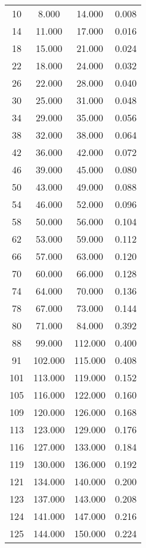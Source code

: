 % 
\begin{tabular}{cccc}
  \hline
  \hline
10 & 8.000 & 14.000 & 0.008 \\ 
  14 & 11.000 & 17.000 & 0.016 \\ 
  18 & 15.000 & 21.000 & 0.024 \\ 
  22 & 18.000 & 24.000 & 0.032 \\ 
  26 & 22.000 & 28.000 & 0.040 \\ 
  30 & 25.000 & 31.000 & 0.048 \\ 
  34 & 29.000 & 35.000 & 0.056 \\ 
  38 & 32.000 & 38.000 & 0.064 \\ 
  42 & 36.000 & 42.000 & 0.072 \\ 
  46 & 39.000 & 45.000 & 0.080 \\ 
  50 & 43.000 & 49.000 & 0.088 \\ 
  54 & 46.000 & 52.000 & 0.096 \\ 
  58 & 50.000 & 56.000 & 0.104 \\ 
  62 & 53.000 & 59.000 & 0.112 \\ 
  66 & 57.000 & 63.000 & 0.120 \\ 
  70 & 60.000 & 66.000 & 0.128 \\ 
  74 & 64.000 & 70.000 & 0.136 \\ 
  78 & 67.000 & 73.000 & 0.144 \\ 
  80 & 71.000 & 84.000 & 0.392 \\ 
  88 & 99.000 & 112.000 & 0.400 \\ 
  91 & 102.000 & 115.000 & 0.408 \\ 
  101 & 113.000 & 119.000 & 0.152 \\ 
  105 & 116.000 & 122.000 & 0.160 \\ 
  109 & 120.000 & 126.000 & 0.168 \\ 
  113 & 123.000 & 129.000 & 0.176 \\ 
  116 & 127.000 & 133.000 & 0.184 \\ 
  119 & 130.000 & 136.000 & 0.192 \\ 
  121 & 134.000 & 140.000 & 0.200 \\ 
  123 & 137.000 & 143.000 & 0.208 \\ 
  124 & 141.000 & 147.000 & 0.216 \\ 
  125 & 144.000 & 150.000 & 0.224 \\ 
   \hline
\end{tabular}

